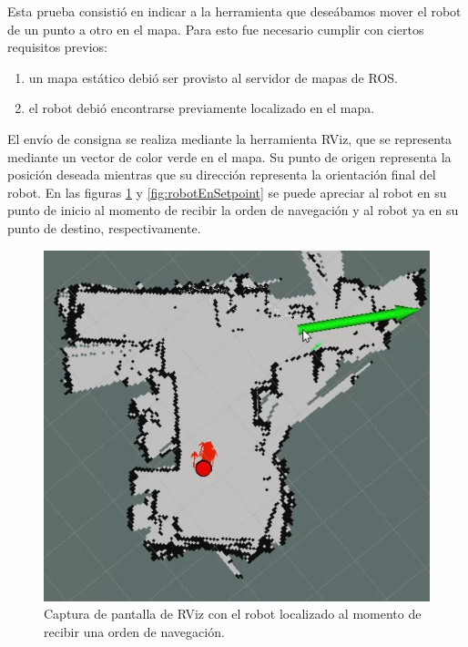 Esta prueba consistió en indicar a la herramienta que deseábamos mover el robot de un punto a otro en el mapa. Para esto fue necesario cumplir con ciertos requisitos previos:

\begin{enumerate}
    \item un mapa estático debió ser provisto al servidor de mapas de ROS.
    \item el robot debió encontrarse previamente localizado en el mapa.
\end{enumerate}

El envío de consigna se realiza mediante la herramienta RViz, que se representa mediante un vector de color verde en el mapa. Su punto de origen representa la posición deseada mientras que su dirección representa la orientación final del robot. En las figuras \ref{fig:comandoNavegación} y \ref{fig:robotEnSetpoint} se puede apreciar al robot en su punto de inicio al momento de recibir la orden de navegación y al robot ya en su punto de destino, respectivamente.


\begin{figure}[ht]
    \centering
    \includegraphics[scale=0.33]{./Figures/comando_navegacion.png}
    \caption{Captura de pantalla de RViz con el robot localizado al momento de recibir una orden de navegación.}
    \label{fig:comandoNavegación}
\end{figure}


